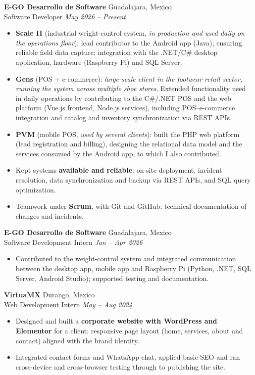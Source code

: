 \documentclass[11pt,a4paper]{article}
\newcommand{\entry}[4]{%
  \textbf{#1} \hfill {\color{muted}#2}\\[1pt]
  {\color{accent}#3} \hfill {\color{muted}\itshape #4}\\[3pt]
}
\begin{document}
\entry{E-GO Desarrollo de Software}{Guadalajara, Mexico}{Software Developer}{May 2026 -- Present}
\begin{itemize}
  \item \textbf{Scale II} (industrial weight-control system, \textit{in production and used daily on the operations floor}):
        lead contributor to the Android app (Java), ensuring reliable field data capture; integration with the .NET/C\#
        desktop application, hardware (Raspberry Pi) and SQL Server.
  \item \textbf{Gens} (POS + e-commerce): \textit{large-scale client in the footwear retail sector, running the system
        across multiple shoe stores}. Extended functionality used in daily operations by contributing to the C\#/.NET POS
        and the web platform (Vue.js frontend, Node.js services), including POS--e-commerce integration and catalog and
        inventory synchronization via REST APIs.
  \item \textbf{PVM} (mobile POS, \textit{used by several clients}): built the PHP web platform (lead registration and
        billing), designing the relational data model and the services consumed by the Android app, to which I also
        contributed.
  \item Kept systems \textbf{available and reliable}: on-site deployment, incident resolution, data synchronization and
        backup via REST APIs, and SQL query optimization.
  \item Teamwork under \textbf{Scrum}, with Git and GitHub; technical documentation of changes and incidents.
\end{itemize}

\entry{E-GO Desarrollo de Software}{Guadalajara, Mexico}{Software Development Intern}{Jan -- Apr 2026}
\begin{itemize}
  \item Contributed to the weight-control system and integrated communication between the desktop app, mobile app and
        Raspberry Pi (Python, .NET, SQL Server, Android Studio); supported testing and documentation.
\end{itemize}

\entry{VirtuaMX}{Durango, Mexico}{Web Development Intern}{May -- Aug 2024}
\begin{itemize}
  \item Designed and built a \textbf{corporate website with WordPress and Elementor} for a client: responsive page layout (home, services, about and contact) aligned with the brand identity.
  \item Integrated contact forms and WhatsApp chat, applied basic SEO and ran cross-device and cross-browser testing through to publishing the site.
\end{itemize}
\end{document}
